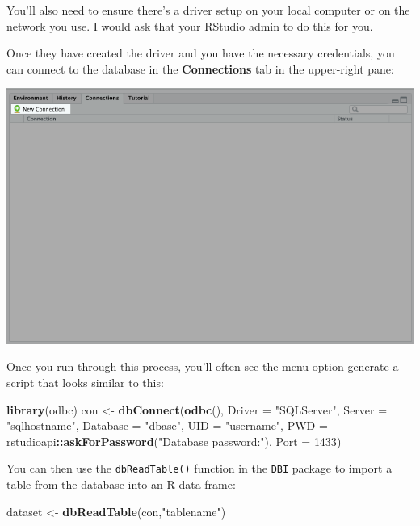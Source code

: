 \documentclass[
]{book}
\newenvironment{Shaded}{\begin{snugshade}}{\end{snugshade}}
\newcommand{\DataTypeTok}[1]{\textcolor[rgb]{0.13,0.29,0.53}{#1}}
\newcommand{\DecValTok}[1]{\textcolor[rgb]{0.00,0.00,0.81}{#1}}
\newcommand{\KeywordTok}[1]{\textcolor[rgb]{0.13,0.29,0.53}{\textbf{#1}}}
\newcommand{\NormalTok}[1]{#1}
\newcommand{\OperatorTok}[1]{\textcolor[rgb]{0.81,0.36,0.00}{\textbf{#1}}}
\newcommand{\StringTok}[1]{\textcolor[rgb]{0.31,0.60,0.02}{#1}}
\begin{document}
\begin{center}
You'll also need to ensure there's a driver setup on your local computer or on the network you use. I would ask that your RStudio admin to do this for you.

Once they have created the driver and you have the necessary credentials, you can connect to the database in the \textbf{Connections} tab in the upper-right pane:

\begin{center}\includegraphics[width=0.6\linewidth]{1.65_Connections} \end{center}

Once you run through this process, you'll often see the menu option generate a script that looks similar to this:

\begin{Shaded}
\begin{Highlighting}[]
\KeywordTok{library}\NormalTok{(odbc)}
\NormalTok{con <-}\StringTok{ }\KeywordTok{dbConnect}\NormalTok{(}\KeywordTok{odbc}\NormalTok{(),}
                 \DataTypeTok{Driver =} \StringTok{"SQLServer"}\NormalTok{,}
                 \DataTypeTok{Server =} \StringTok{"sqlhostname"}\NormalTok{,}
                 \DataTypeTok{Database =} \StringTok{"dbase"}\NormalTok{,}
                 \DataTypeTok{UID =} \StringTok{"username"}\NormalTok{,}
                 \DataTypeTok{PWD =}\NormalTok{ rstudioapi}\OperatorTok{::}\KeywordTok{askForPassword}\NormalTok{(}\StringTok{"Database password:"}\NormalTok{),}
                 \DataTypeTok{Port =} \DecValTok{1433}\NormalTok{)}
\end{Highlighting}
\end{Shaded}

You can then use the \texttt{dbReadTable()} function in the \texttt{DBI} package to import a table from the database into an R data frame:

\begin{Shaded}
\begin{Highlighting}[]
\NormalTok{dataset <-}\StringTok{ }\KeywordTok{dbReadTable}\NormalTok{(con,}\StringTok{"tablename"}\NormalTok{)}
\end{Highlighting}
\end{Shaded}


\end{center}
\end{document}
